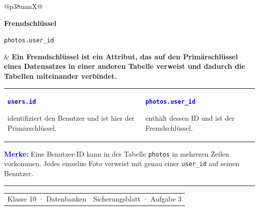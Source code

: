 \documentclass[10pt,a4paper]{article}
\begin{document}
\vspace{0.4mm}
\begin{tabularx}{\linewidth}{@{}p{38mm}X@{}}
  \colorbox{KeyBg}{\parbox{34mm}{\centering\textbf{Fremdschlüssel}\par\small\texttt{photos.user\_id}}}
  &
  \textbf{Ein Fremdschlüssel ist ein Attribut, das auf den Primärschlüssel
  eines Datensatzes in einer anderen Tabelle verweist und dadurch die Tabellen
  miteinander verbindet.}
\end{tabularx}

\vspace{1.4mm}
\begin{tabularx}{\linewidth}{@{}X X@{}}
  \textcolor{Blue}{\bfseries\texttt{users.id}}\par
  identifiziert den Benutzer und ist hier der Primärschlüssel. &
  \textcolor{Blue}{\bfseries\texttt{photos.user\_id}}\par
  enthält dessen ID und ist der Fremdschlüssel.
\end{tabularx}

\vspace{1.7mm}
\colorbox{Mint}{%
  \parbox{\dimexpr\linewidth-2\fboxsep\relax}{%
    \vspace{1.5mm}
    \textcolor{Blue}{\bfseries Merke:}
    Eine Benutzer-ID kann in der Tabelle \texttt{photos} in mehreren Zeilen
    vorkommen. Jedes einzelne Foto verweist mit genau einer
    \texttt{user\_id} auf seinen Benutzer.
    \vspace{1.5mm}
  }%
}

\vfill
{\color{Line}\rule{\linewidth}{0.5pt}}\par
\vspace{1.3mm}
\begin{tabularx}{\linewidth}{@{}Xr@{}}
  {\small\color{Muted}Klasse 10 · Datenbanken} &
  {\small\color{Muted}Sicherungsblatt · Aufgabe 3}
\end{tabularx}
\end{document}
